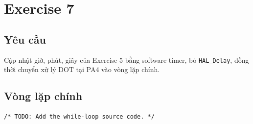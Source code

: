 \section{Exercise 7}

\subsection{Yêu cầu}
Cập nhật giờ, phút, giây của Exercise 5 bằng software timer, bỏ
\texttt{HAL\_Delay}, đồng thời chuyển xử lý DOT tại PA4 vào vòng lặp chính.

\subsection{Vòng lặp chính}
\begin{lstlisting}[caption={Main loop -- Exercise 7}]
/* TODO: Add the while-loop source code. */
\end{lstlisting}
